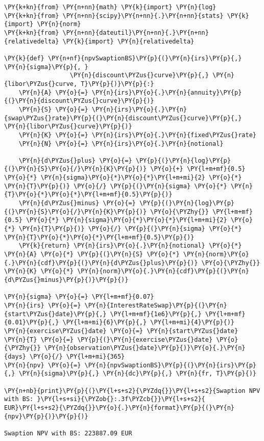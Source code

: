 \begin{tcolorbox}[breakable, size=fbox, boxrule=1pt, pad at break*=1mm,colback=cellbackground, colframe=cellborder]
\begin{Verbatim}[commandchars=\\\{\}]
\PY{k+kn}{from} \PY{n+nn}{math} \PY{k}{import} \PY{n}{log}
\PY{k+kn}{from} \PY{n+nn}{scipy}\PY{n+nn}{.}\PY{n+nn}{stats} \PY{k}{import} \PY{n}{norm} 
\PY{k+kn}{from} \PY{n+nn}{dateutil}\PY{n+nn}{.}\PY{n+nn}{relativedelta} \PY{k}{import} \PY{n}{relativedelta}

\PY{k}{def} \PY{n+nf}{npvSwaptionBS}\PY{p}{(}\PY{n}{irs}\PY{p}{,} \PY{n}{sigma}\PY{p}{, } 
                  \PY{n}{discount\PYZus{}curve}\PY{p}{,} \PY{n}{libor\PYZus{}curve, T}\PY{p}{)}\PY{p}{:}
    \PY{n}{A} \PY{o}{=} \PY{n}{irs}\PY{o}{.}\PY{n}{annuity}\PY{p}{(}\PY{n}{discount\PYZus{}curve}\PY{p}{)}
    \PY{n}{S} \PY{o}{=} \PY{n}{irs}\PY{o}{.}\PY{n}{swap\PYZus{}rate}\PY{p}{(}\PY{n}{discount\PYZus{}curve}\PY{p}{,} \PY{n}{libor\PYZus{}curve}\PY{p}{)}
    \PY{n}{K} \PY{o}{=} \PY{n}{irs}\PY{o}{.}\PY{n}{fixed\PYZus{}rate}
    \PY{n}{N} \PY{o}{=} \PY{n}{irs}\PY{o}{.}\PY{n}{notional}
    
    \PY{n}{d\PYZus{}plus} \PY{o}{=} \PY{p}{(}\PY{n}{log}\PY{p}{(}\PY{n}{S}\PY{o}{/}\PY{n}{K}\PY{p}{)} \PY{o}{+} \PY{l+m+mf}{0.5} \PY{o}{*} \PY{n}{sigma}\PY{o}{*}\PY{o}{*}\PY{l+m+mi}{2} \PY{o}{*} \PY{n}{T}\PY{p}{)} \PY{o}{/} \PY{p}{(}\PY{n}{sigma} \PY{o}{*} \PY{n}{T}\PY{o}{*}\PY{o}{*}\PY{l+m+mf}{0.5}\PY{p}{)}
    \PY{n}{d\PYZus{}minus} \PY{o}{=} \PY{p}{(}\PY{n}{log}\PY{p}{(}\PY{n}{S}\PY{o}{/}\PY{n}{K}\PY{p}{)} \PY{o}{\PYZhy{}} \PY{l+m+mf}{0.5} \PY{o}{*} \PY{n}{sigma}\PY{o}{*}\PY{o}{*}\PY{l+m+mi}{2} \PY{o}{*} \PY{n}{T}\PY{p}{)} \PY{o}{/} \PY{p}{(}\PY{n}{sigma} \PY{o}{*} \PY{n}{T}\PY{o}{*}\PY{o}{*}\PY{l+m+mf}{0.5}\PY{p}{)}
    \PY{k}{return} \PY{n}{irs}\PY{o}{.}\PY{n}{notional} \PY{o}{*} \PY{n}{A} \PY{o}{*} \PY{p}{(}\PY{n}{S} \PY{o}{*} \PY{n}{norm}\PY{o}{.}\PY{n}{cdf}\PY{p}{(}\PY{n}{d\PYZus{}plus}\PY{p}{)} \PY{o}{\PYZhy{}} \PY{n}{K} \PY{o}{*} \PY{n}{norm}\PY{o}{.}\PY{n}{cdf}\PY{p}{(}\PY{n}{d\PYZus{}minus}\PY{p}{)}\PY{p}{)}

\PY{n}{sigma} \PY{o}{=} \PY{l+m+mf}{0.07}
\PY{n}{irs} \PY{o}{=} \PY{n}{InterestRateSwap}\PY{p}{(}\PY{n}{start\PYZus{}date}\PY{p}{,} \PY{l+m+mf}{1e6}\PY{p}{,} \PY{l+m+mf}{0.01}\PY{p}{,} \PY{l+m+mi}{6}\PY{p}{,} \PY{l+m+mi}{4}\PY{p}{)}
\PY{n}{exercise\PYZus{}date} \PY{o}{=} \PY{n}{start\PYZus{}date} 
\PY{n}{T} \PY{o}{=} \PY{p}{(}\PY{n}{exercise\PYZus{}date} \PY{o}{\PYZhy{}} \PY{n}{observation\PYZus{}date}\PY{p}{)}\PY{o}{.}\PY{n}{days} \PY{o}{/} \PY{l+m+mi}{365}
\PY{n}{npv} \PY{o}{=} \PY{n}{npvSwaptionBS}\PY{p}{(}\PY{n}{irs}\PY{p}{,} \PY{n}{sigma}\PY{p}{,} \PY{n}{dc}\PY{p}{,} \PY{n}{fr, T}\PY{p}{)}

\PY{n+nb}{print}\PY{p}{(}\PY{l+s+s2}{\PYZdq{}}\PY{l+s+s2}{Swaption NPV with BS: }\PY{l+s+si}{\PYZob{}:.3f\PYZcb{}}\PY{l+s+s2}{ EUR}\PY{l+s+s2}{\PYZdq{}}\PY{o}{.}\PY{n}{format}\PY{p}{(}\PY{n}{npv}\PY{p}{)}\PY{p}{)}

Swaption NPV with BS: 223887.09 EUR
\end{Verbatim}
\end{tcolorbox}

